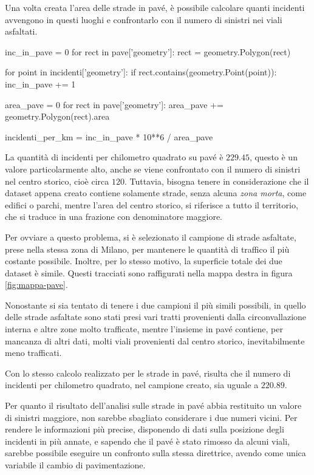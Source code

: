 \documentclass[a4paper,12pt]{report}
\newcommand{\quotestyle}[1]{\textit{#1}}
\begin{document}
Una volta creata l'area delle strade in pavé, è possibile calcolare quanti 
incidenti avvengono in questi luoghi e confrontarlo con il numero di sinistri 
nei viali asfaltati. 

\begin{code}
inc_in_pave = 0
for rect in pave['geometry']: 
    rect = geometry.Polygon(rect)

    for point in incidenti['geometry']: 
        if rect.contains(geometry.Point(point)): 
            inc_in_pave += 1

area_pave = 0
for rect in pave['geometry']: 
    area_pave += geometry.Polygon(rect).area

incidenti_per_km = inc_in_pave * 10**6 / area_pave
\end{code}

La quantità di incidenti per chilometro quadrato su pavé è $229.45$, 
questo è un valore particolarmente alto, anche se viene confrontato con il numero di 
sinistri nel centro storico, cioè circa $120$. 
Tuttavia, bisogna tenere in considerazione che il dataset appena creato 
contiene solamente strade, senza alcuna \quotestyle{zona morta}, 
come edifici o parchi, mentre l'area del centro storico, 
si riferisce a tutto il territorio, che si traduce in una frazione con 
denominatore maggiore. 

Per ovviare a questo problema, si è selezionato il campione di strade asfaltate, 
prese nella stessa zona di Milano, per mantenere le quantità di traffico il più 
costante possibile. 
Inoltre, per lo stesso motivo, la superficie totale dei due dataset è simile. 
Questi tracciati sono raffigurati nella mappa destra in figura \ref{fig:mappa-pave}. 

Nonostante si sia tentato di tenere i due campioni il più simili 
possibili, in quello delle strade asfaltate sono stati presi vari tratti 
provenienti dalla circonvallazione interna e altre zone molto trafficate, 
mentre l'insieme in pavé contiene, per mancanza di altri dati, 
molti viali provenienti dal centro storico, inevitabilmente 
meno trafficati. 

Con lo stesso calcolo realizzato per le strade in pavé, risulta che 
il numero di incidenti per 
chilometro quadrato, nel campione creato, sia uguale a $220.89$. 

Per quanto il risultato dell'analisi sulle strade in pavé abbia restituito un valore di 
sinistri maggiore, non sarebbe sbagliato considerare i due numeri vicini. 
Per rendere le informazioni più precise, disponendo di dati sulla 
posizione degli incidenti in più annate, e sapendo che il pavé è stato 
rimosso da alcuni viali, sarebbe possibile eseguire un confronto 
sulla stessa direttrice, avendo come unica variabile il cambio di pavimentazione. 
\end{document}

